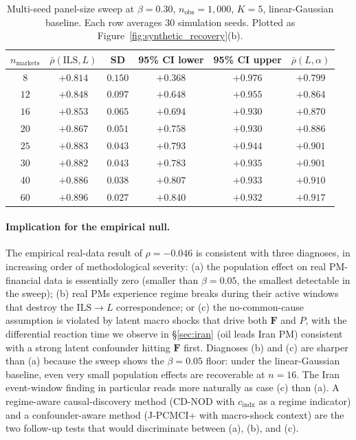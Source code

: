\documentclass{article}
\begin{document}
\begin{table}[h]
\centering
\caption{Multi-seed panel-size sweep at $\beta = 0.30$, $n_\text{obs} = 1{,}000$, $K = 5$, linear-Gaussian baseline. Each row averages 30 simulation seeds. Plotted as Figure~\ref{fig:synthetic_recovery}(b).}
\label{tab:n_curve}
\small
\begin{tabular}{cccccc}
\toprule
$n_\text{markets}$ & $\bar\rho(\mathrm{ILS}, L)$ & SD & 95\% CI lower & 95\% CI upper & $\bar\rho(L, \alpha)$ \\
\midrule
$8$  & $+0.814$ & $0.150$ & $+0.368$ & $+0.976$ & $+0.799$ \\
$12$ & $+0.848$ & $0.097$ & $+0.648$ & $+0.955$ & $+0.864$ \\
$16$ & $+0.853$ & $0.065$ & $+0.694$ & $+0.930$ & $+0.870$ \\
$20$ & $+0.867$ & $0.051$ & $+0.758$ & $+0.930$ & $+0.886$ \\
$25$ & $+0.883$ & $0.043$ & $+0.793$ & $+0.944$ & $+0.901$ \\
$30$ & $+0.882$ & $0.043$ & $+0.783$ & $+0.935$ & $+0.901$ \\
$40$ & $+0.886$ & $0.038$ & $+0.807$ & $+0.933$ & $+0.910$ \\
$60$ & $+0.896$ & $0.027$ & $+0.840$ & $+0.932$ & $+0.917$ \\
\bottomrule
\end{tabular}
\end{table}

\paragraph{Implication for the empirical null.}
The empirical real-data result of $\rho = -0.046$ is consistent with three diagnoses, in increasing order of methodological severity: (a) the population effect on real PM-financial data is essentially zero (smaller than $\beta = 0.05$, the smallest detectable in the sweep); (b) real PMs experience regime breaks during their active windows that destroy the $\mathrm{ILS} \to L$ correspondence; or (c) the no-common-cause assumption is violated by latent macro shocks that drive both $\mathbf{F}$ and $P$, with the differential reaction time we observe in \S\ref{sec:iran} (oil leads Iran PM) consistent with a strong latent confounder hitting $\mathbf{F}$ first. Diagnoses (b) and (c) are sharper than (a) because the sweep shows the $\beta = 0.05$ floor: under the linear-Gaussian baseline, even very small population effects are recoverable at $n = 16$. The Iran event-window finding in particular reads more naturally as case (c) than (a). A regime-aware causal-discovery method (CD-NOD with $c_\text{indx}$ as a regime indicator) and a confounder-aware method (J-PCMCI+ with macro-shock context) are the two follow-up tests that would discriminate between (a), (b), and (c).
\end{document}
